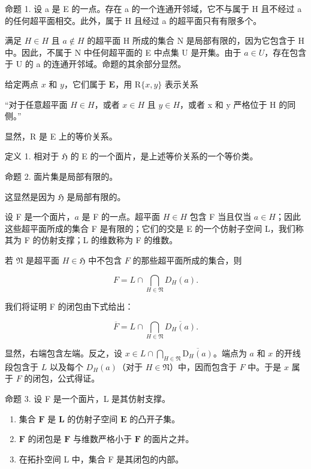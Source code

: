 命题 1. 设 a 是 E 的一点。存在 a 的一个连通开邻域，它不与属于 H 且不经过 a 的任何超平面相交。此外，属于 H 且经过 a 的超平面只有有限多个。

满足 \(H \in H\) 且 \(a \notin H\) 的超平面 H 所成的集合 N 是局部有限的，因为它包含于 H 中。因此，不属于 N 中任何超平面的 E 中点集 U 是开集。由于 \(a \in U\)，存在包含于 U 的 a 的连通开邻域。命题的其余部分显然。

给定两点 \(x\) 和 \(y\)，它们属于 \(\mathbf{E}\)，用 \(\mathrm{R}\{x,y\}\) 表示关系

“对于任意超平面 \(H \in H\)，或者 \(x \in H\) 且 \(y \in H\)，或者 x 和 y 严格位于 H 的同侧。”

显然，R 是 E 上的等价关系。

定义 1. 相对于 \(\mathfrak{H}\) 的 E 的一个面片，是上述等价关系的一个等价类。

命题 2. 面片集是局部有限的。

这显然是因为 \(\mathfrak{H}\) 是局部有限的。

设 F 是一个面片，\(a\) 是 F 的一点。超平面 \(H \in H\) 包含 F 当且仅当 \(a \in H\)；因此这些超平面所成的集合 F 是有限的；它们的交是 E 的一个仿射子空间 L，我们称其为 F 的仿射支撑；L 的维数称为 F 的维数。

若 \(\mathfrak{N}\) 是超平面 \(H\in \mathfrak{H}\) 中不包含 \(F\) 的那些超平面所成的集合，则

\[
F = L \cap \bigcap_ {H \in \mathfrak {N}} D _ {H} (a).\tag{2}
\]

我们将证明 F 的闭包由下式给出：

\[
\overline {{F}} = L \cap \bigcap_ {H \in \mathfrak {N}} \overline {{D _ {H} (a)}}.\tag{3}
\]

显然，右端包含左端。反之，设 \(x \in L \cap \bigcap_{H \in \mathfrak{N}} \overline{\mathrm{D}_H(a)}\)。端点为 \(a\) 和 \(x\) 的开线段包含于 \(L\) 以及每个 \(D_H(a)\)（对于 \(H \in \mathfrak{N}\)）中，因而包含于 \(F\) 中。于是 \(x\) 属于 \(F\) 的闭包，公式得证。

命题 3. 设 F 是一个面片，L 是其仿射支撑。

\begin{enumerate}
\def\labelenumi{(\roman{enumi})}
\item
  集合 \(\mathbf{F}\) 是 \(\mathbf{L}\) 的仿射子空间 \(\mathbf{E}\) 的凸开子集。
\item
  \(\mathbf{F}\) 的闭包是 \(\mathbf{F}\) 与维数严格小于 \(\mathbf{F}\) 的面片之并。
\item
  在拓扑空间 L 中，集合 F 是其闭包的内部。
\end{enumerate}

